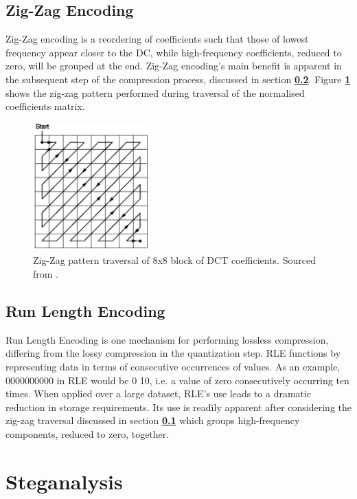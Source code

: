 \documentclass{l4proj}
\begin{document}
\subsection{Zig-Zag Encoding}\label{zig-zag}

Zig-Zag encoding is a reordering of coefficients such that those of lowest frequency appear closer to the DC, while high-frequency coefficients, reduced to zero, will be grouped at the end. Zig-Zag encoding's main benefit is apparent in the subsequent step of the compression process, discussed in section \textbf{\ref{RLE}}. Figure \textbf{\ref{fig:zig_zag_pattern}} shows the zig-zag pattern performed during traversal of the normalised coefficients matrix.

\begin{figure}[]
    \centering
    \includegraphics[width=0.4\textwidth]{images/zigzag_pattern.jpg}
    \caption{Zig-Zag pattern traversal of 8x8 block of DCT coefficients. Sourced from \citet{khalid_2021}.}
    \label{fig:zig_zag_pattern}
\end{figure}

\subsection{Run Length Encoding}\label{RLE}

Run Length Encoding is one mechanism for performing lossless compression, differing from the lossy compression in the quantization step. RLE functions by representing data in terms of consecutive occurrences of values. As an example, 0000000000 in RLE would be 0 10, i.e. a value of zero consecutively occurring ten times. When applied over a large dataset, RLE's use leads to a dramatic reduction in storage requirements. Its use is readily apparent after considering the zig-zag traversal discussed in section \textbf{\ref{zig-zag}} which groups high-frequency components, reduced to zero, together.

\section{Steganalysis}\label{steganalysis}
\end{document}
